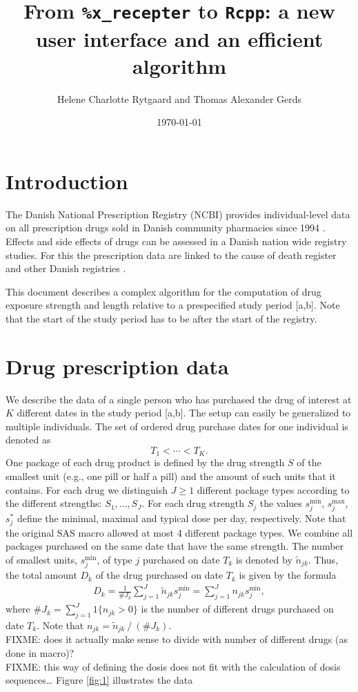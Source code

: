\documentclass{article}
\author{Helene Charlotte Rytgaard and Thomas Alexander Gerds}
\date{\today}
\title{From \texttt{\%x\_recepter} to \texttt{Rcpp}: a new user interface and an efficient algorithm}
\newcommand{\one}{1}
\newcommand{\str}{S}
\newcommand{\smin}{s^{\min}}
\newcommand{\smax}{s^{\max}}
\newcommand{\styp}{s^{*}}
\newcommand{\period}{[a,b]}
\begin{document}
\maketitle
\section{Introduction}
\label{sec:orgheadline1}

The Danish National Prescription Registry (NCBI) provides
individual-level data on all prescription drugs sold in Danish
community pharmacies since 1994 \citep{kildemoes2011danish}. Effects and
side effects of drugs can be assessed in a Danish nation wide registry
studies. For this the prescription data are linked to the cause of
death register and other Danish registries
\citep{thygesen2011introduction}.

This document describes a complex algorithm for the computation of
drug exposure strength and length relative to a prespecified study
period \period. Note that the start of the study period has to be
after the start of the registry.

\section{Drug prescription data}
\label{sec:orgheadline2}

We describe the data of a single person who has purchased the drug of
interest at \({K}\) different dates in the study period \period. The
setup can easily be generalized to multiple individuals. The set of
ordered drug purchase dates for one individual is denoted as
\begin{equation*}
{T}_1< \cdots< {T}_{K}.
\end{equation*}
One package of each drug product is defined by the drug strength
\(\str\) of the smallest unit (e.g., one pill or half a pill) and the
amount of such units that it contains. For each drug we distinguish
\(J\ge 1\) different package types according to the different
strengths: \(\str_1,\dots,\str_J\). For each drug strength \(\str_j\) the values \(\smin_j\), \(\smax_j\), \(\styp_j\)
 define the minimal, maximal and typical dose per day, respectively. Note that
the original SAS macro allowed at most 4 different package types. We
combine all packages purchased on the same date that have the same
strength. The number of smallest units, \(\smin_j\), of type
\(j\) purchased on date \(T_k\) is denoted by \(\tilde{n}_{jk}\). Thus, the
total amount \(D_k\) of the drug purchased on date \(T_k\) is given by
the formula
\begin{align*}
D_k=\frac{1}{\# J_k} \sum_{j=1}^J\tilde{n}_{jk}\smin_{j} = \sum_{j=1}^J n_{jk} \smin_j,
\end{align*}
where \(\# J_k = \sum_{j=1} ^J \one \lbrace n_{jk}>0\rbrace\) is the number of different drugs purchased on date \(T_k\). Note that \(n_{jk} = \tilde{n}_{jk} \mathbin{/} (\# J_k)\). \\
FIXME: does it actually  make sense to divide with number of different drugs (as done in macro)?\\
FIXME: this way of defining the dosis does not fit with the calculation of dosis sequences\ldots{} 
Figure \ref{fig:1} illustrates the data
\end{document}
